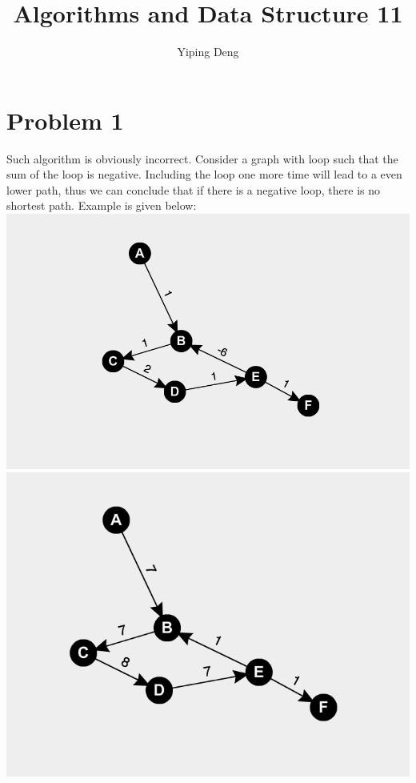 \documentclass{article}
\newcommand{\hwnumber}{11}
\begin{document}
\title{Algorithms and Data Structure \hwnumber}
\author{Yiping Deng}
\maketitle
\thispagestyle{fancy}
\section*{Problem 1}
Such algorithm is obviously incorrect. 
Consider a graph with loop such that the
sum of the loop is negative. Including the loop one more time will lead to a even lower path,
thus we can conclude that if there is a negative loop, there is no shortest path.
Example is given below:\\
\includegraphics[width=\textwidth]{g1.png} \\
\includegraphics[width=\textwidth]{g2.png}
\end{document}
